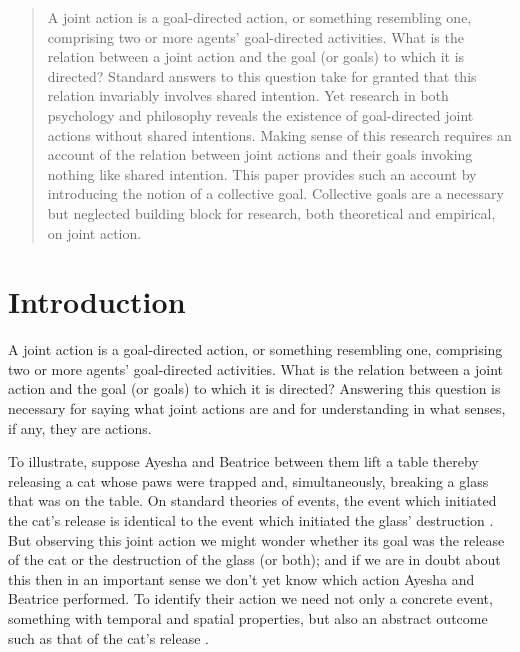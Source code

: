\documentclass[12pt,a4paper]{extarticle}
\begin{document}
\setlength\footnotesep{1em}


\maketitle

\begin{abstract}
A joint action is a goal-directed action, or something resembling one, comprising two or more agents' goal-directed activities.  
What is the relation between a joint action and the goal (or goals) to which it is directed?  
Standard answers to this question take for granted that  this relation invariably involves shared intention.  
Yet research in both psychology and philosophy reveals the existence of goal-directed joint actions without shared intentions.
Making sense of this research requires an account of the relation between joint actions and their goals invoking nothing like shared intention.
This paper provides such an account by introducing the notion of a collective goal.
Collective goals are a necessary but neglected building block for research, both theoretical and empirical, on joint action.



\end{abstract}


\section{Introduction}
A joint action is a goal-directed action, or something resembling one, comprising two or more agents' goal-directed activities.  What is the relation between a joint action and the goal (or goals) to which it is directed?  
Answering this question is necessary for saying what joint actions are and for understanding in what senses, if any, they are actions.


To illustrate, suppose Ayesha and Beatrice between them lift a table thereby releasing a cat whose paws were trapped and,  simultaneously, breaking a glass that was on the table.  On standard theories of events, the event which initiated the cat's release is identical to the event which initiated the glass' destruction \citep{Davidson:1969ie}.  But observing this joint action we might wonder whether its goal was the release of the cat or the destruction of the glass (or both); and if we are in doubt about this then in an important sense we don't yet know which action Ayesha and Beatrice performed.  To identify their action we need not only a concrete event, something with temporal and spatial properties, but also an abstract outcome such as that of the cat's release \citep{Davidson:1971fz}.
\end{document}
